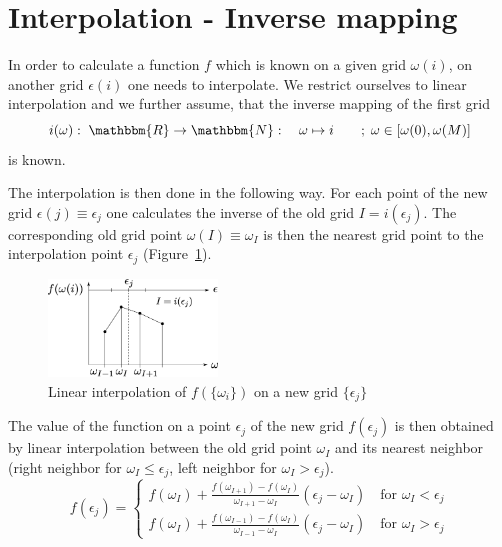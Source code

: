 \section{Interpolation - Inverse mapping}
In order to calculate a function $f$ which is known on a given grid $\omega(i)$, on another grid $\epsilon(i)$ one needs to interpolate. We restrict ourselves to linear interpolation and we further assume, that the inverse mapping of the first grid
\[
	i(\omega):\;\mathbbm{R}\to\mathbbm{N}:\quad \omega \mapsto i\quad\quad;\;\omega\in[\omega(0), \omega(M)]
\]
is known.

The interpolation is then done in the following way. For each point of the new grid $\epsilon(j)\equiv \epsilon_j$ one calculates the inverse of the old grid $I=i(\epsilon_j)$. The corresponding old grid point $\omega(I)\equiv \omega_I$ is then the nearest grid point to the interpolation point $\epsilon_j$ (Figure~\ref{fig:interpolation}). 
\begin{figure}[ht]
	\centering
	\includegraphics[width=0.4\textwidth]{pics/interpolation.eps}
	\caption{Linear interpolation of $f(\{\omega_i\})$ on a new grid $\{ \epsilon_j \}$}
	\label{fig:interpolation}
\end{figure}

The value of the function on a point $\epsilon_j$ of the new grid $f(\epsilon_j)$ is then obtained by linear interpolation between the old grid point $\omega_I$ and its nearest neighbor (right neighbor for $\omega_I\leq\epsilon_j$, left neighbor for $\omega_I>\epsilon_j$).
\[
	f(\epsilon_j)=\begin{cases}
		f(\omega_I)+\frac{f(\omega_{I+1})-f(\omega_{I})}{\omega_{I+1}-\omega_{I}} (\epsilon_j-\omega_I) \quad \text{for } \omega_I<\epsilon_j \\
		f(\omega_I)+\frac{f(\omega_{I-1})-f(\omega_{I})}{\omega_{I-1}-\omega_{I}} (\epsilon_j-\omega_I) \quad \text{for } \omega_I>\epsilon_j 
	\end{cases}
\]






